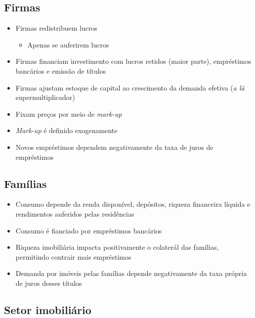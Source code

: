 \documentclass[11pt]{article}
\providecommand{\tightlist}{%
      \setlength{\itemsep}{0pt}\setlength{\parskip}{0pt}}
\begin{document}
    \hypertarget{firmas}{%
\subsection{Firmas}\label{firmas}}

\begin{itemize}
\tightlist
\item
  Firmas redistribuem lucros

  \begin{itemize}
  \tightlist
  \item
    Apenas se auferirem lucros
  \end{itemize}
\item
  Firmas financiam investimento com lucros retidos (maior parte),
  empréstimos bancários e emissão de títulos
\item
  Firmas ajustam estoque de capital ao crescimento da demanda efetiva
  (\emph{a lá} supermultiplicador)
\item
  Fixam preços por meio de \emph{mark-up}
\item
  \emph{Mark-up} é definido exogenamente
\item
  Novos empréstimos dependem negativamente da taxa de juros de
  empréstimos
\end{itemize}

    \hypertarget{famuxedlias}{%
\subsection{Famílias}\label{famuxedlias}}

\begin{itemize}
\tightlist
\item
  Consumo depende da renda disponível, depósitos, riqueza financeira
  líquida e rendimentos auferidos pelas residências
\item
  Consumo é fianciado por empréstimos bancários
\item
  Riqueza imobiliária impacta positivamente o colaterál das famílias,
  permitindo contrair mais empréstimos
\item
  Demanda por imóveis pelas famílias depende negativamente da taxa
  própria de juros desses títulos
\end{itemize}

    \hypertarget{setor-imobiliuxe1rio}{%
\subsection{Setor imobiliário}\label{setor-imobiliuxe1rio}}
\end{document}
